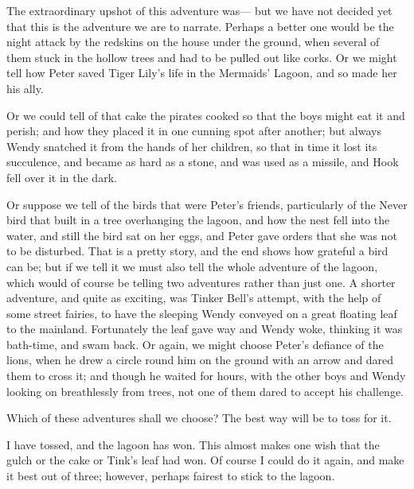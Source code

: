 The extraordinary upshot of this adventure was—%
but we have not decided yet that this is the adventure we are to narrate.
Perhaps a better one would be the night attack by the redskins on the house under the ground,
when several of them stuck in the hollow trees and had to be pulled out like corks.
Or we might tell how Peter saved Tiger Lily's life in the Mermaids' Lagoon, and so made her his ally.

Or we could tell of that cake the pirates cooked so that the boys might eat it and perish;
and how they placed it in one cunning spot after another;
but always Wendy snatched it from the hands of her children,
so that in time it lost its succulence, and became as hard as a stone, and was used as a missile,
and Hook fell over it in the dark.

Or suppose we tell of the birds that were Peter's friends,
particularly of the Never bird that built in a tree overhanging the lagoon,
and how the nest fell into the water, and still the bird sat on her eggs,
and Peter gave orders that she was not to be disturbed.
That is a pretty story, and the end shows how grateful a bird can be;
but if we tell it we must also tell the whole adventure of the lagoon,
which would of course be telling two adventures rather than just one.
A shorter adventure, and quite as exciting, was Tinker Bell's attempt, with the help of some street fairies,
to have the sleeping Wendy conveyed on a great floating leaf to the mainland.
Fortunately the leaf gave way and Wendy woke, thinking it was bath-time, and swam back.
Or again, we might choose Peter's defiance of the lions,
when he drew a circle round him on the ground with an arrow and dared them to cross it;
and though he waited for hours, with the other boys and Wendy looking on breathlessly from trees,
not one of them dared to accept his challenge.

Which of these adventures shall we choose?
The best way will be to toss for it.

I have tossed, and the lagoon has won.
This almost makes one wish that the gulch or the cake or Tink's leaf had won.
Of course I could do it again, and make it best out of three;
however, perhaps fairest to stick to the lagoon.

\endinput

